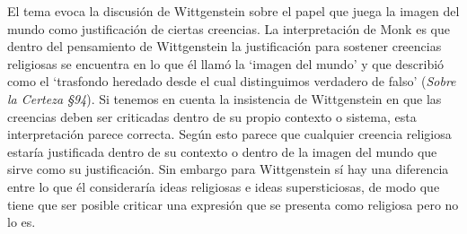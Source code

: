 El tema evoca la discusión de Wittgenstein sobre el papel que juega la imagen del mundo como justificación de ciertas creencias. La interpretación de Monk es que dentro del pensamiento de Wittgenstein la justificación para sostener creencias religiosas se encuentra en lo que él llamó la `imagen del mundo' y que describió como el \enquote*{trasfondo heredado desde el cual distinguimos verdadero de falso} (\emph{Sobre la Certeza \S94}). Si tenemos en cuenta la insistencia de Wittgenstein en que las creencias deben ser criticadas dentro de su propio contexto o sistema, esta interpretación parece correcta. Según esto parece que cualquier creencia religiosa estaría justificada dentro de su contexto o dentro de la imagen del mundo que sirve como su justificación. Sin embargo para Wittgenstein sí hay una diferencia entre lo que él consideraría ideas religiosas e ideas supersticiosas, de modo que tiene que ser posible criticar una expresión que se presenta como religiosa pero no lo es.

